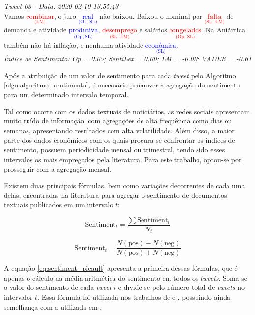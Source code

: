 \bigskip
\bigskip

\textit{Tweet 03 - Data: 2020-02-10 13:55:43} \\
Vamos \textcolor{red}{$\underset{\text{(LM)}}{\text{combinar}}$}, o juro \textcolor{blue}{$\underset{\text{(Op, SL)}}{\text{real}}$} não baixou. Baixou o nominal por \textcolor{red}{$\underset{\text{(SL, LM)}}{\text{falta}}$} de demanda e atividade \textcolor{blue}{$\underset{\text{(Op, SL)}}{\text{produtiva}}$}, \textcolor{red}{$\underset{\text{(SL, LM)}}{\text{desemprego}}$} e salários \textcolor{red}{$\underset{\text{(Op, SL)}}{\text{congelados}}$}. Na Antártica também não há inflação, e nenhuma atividade \textcolor{blue}{$\underset{\text{(SL)}}{\text{econômica}}$}. \\
\textit{\small Índice de Sentimento: Op = 0.05; SentiLex = 0.00; LM = -0.09; VADER = -0.61}

\bigskip
\bigskip

Após a atribuição de um valor de sentimento para cada \textit{tweet} pelo Algoritmo \ref{algo:algoritmo_sentimento}, é necessário promover a agregação do sentimento para um determinado intervalo temporal. 

Tal como ocorre com os dados textuais de noticiários, as redes sociais apresentam muito ruído de informação, com agregações de alta frequência como dias ou semanas, apresentando resultados com alta volatilidade. Além disso, a maior parte dos dados econômicos com os quais procura-se confrontar os índices de sentimento, possuem periodicidade mensal ou trimestral, tendo sido esses intervalos os mais empregados pela literatura. Para este trabalho, optou-se por prosseguir com a agregação mensal.

Existem duas principais fórmulas, bem como variações decorrentes de cada uma delas, encontradas na literatura para agregar o sentimento de documentos textuais publicados em um intervalo \(t\):

\begin{equation}
\label{eq:sentiment_picault}
\text{Sentiment}_t = \frac{\sum \text{Sentiment}_i}{N_t}
\end{equation}

\begin{equation}
\label{eq:sentiment_carosia}
\text{Sentiment}_t = \frac{N(\text{pos}) - N(\text{neg})}{N(\text{pos}) + N(\text{neg})}
\end{equation}

A equação \ref{eq:sentiment_picault} apresenta a primeira dessas fórmulas, que é apenas o cálculo da média aritmética do sentimento em todos os \textit{tweets}. Soma-se o valor do sentimento de cada \textit{tweet} \(i\) e divide-se pelo número total de \textit{tweets} no intervalor \(t\). Essa fórmula foi utilizada nos trabalhos de \textcite{de_melo_comparing_2021} e \textcite{picault_media_2022}, possuindo ainda semelhança com a utilizada em \textcite{nyman_news_2021}.

